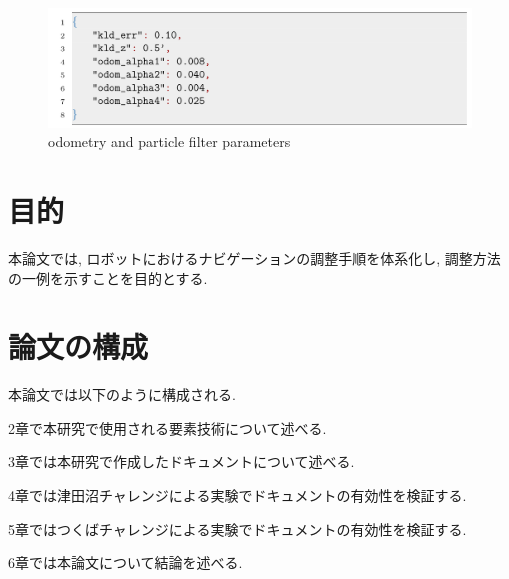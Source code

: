\begin{figure}[hbtp]
  \centering
 \includegraphics[keepaspectratio, scale=0.3]
      {images/senkou_2.png}
 \caption{odometry and particle filter parameters}
 \label{Fig:odometry and particle filter parameters}
\end{figure}
\newpage
\section{目的}
本論文では, ロボットにおけるナビゲーションの調整手順を体系化し, 調整方法の一例を示すことを目的とする. 

\section{論文の構成}
本論文では以下のように構成される. 

2章で本研究で使用される要素技術について述べる. 

3章では本研究で作成したドキュメントについて述べる. 

4章では津田沼チャレンジによる実験でドキュメントの有効性を検証する. 

5章ではつくばチャレンジによる実験でドキュメントの有効性を検証する. 

6章では本論文について結論を述べる. 

\newpage
